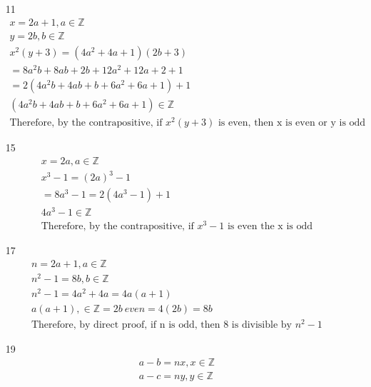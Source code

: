 \documentclass[12pt]{article}
\begin{document}
\begin{enumerate}
	\item [11]
	    \begin{equation*}
	    	\begin{split}
		    x = 2a + 1, a \in \mathbb{Z}\\
		    y = 2b, b \in \mathbb{Z}\\
		    x^2 (y+3) = (4a^2 + 4a + 1)(2b + 3)\\
		    = 8a^2b + 8ab + 2b + 12a^2 + 12a + 2 + 1\\
		    = 2(4a^2b + 4ab + b + 6a^2 + 6a + 1) + 1\\
		    (4a^2b + 4ab + b + 6a^2 + 6a + 1) \in \mathbb{Z}\\
		    \text{Therefore, by the contrapositive, if $x^2(y + 3)$ is even, then x is even or y is odd}
	    	\end{split}
	    \end{equation*}
	\item [15]
	    \begin{equation*}
	    	\begin{split}
		    x = 2a, a \in \mathbb{Z}\\
		    x^3 - 1 = (2a)^3 - 1\\
		    = 8a^3 - 1 = 2(4a^3 - 1) + 1\\
		    4a^3 - 1 \in \mathbb{Z}\\
		    \text{Therefore, by the contrapositive, if $x^3-1$ is even the x is odd}
	    	\end{split}
	    \end{equation*}
	\item [17] 
	    \begin{equation*}
	    	\begin{split}
		    n = 2a + 1, a \in \mathbb{Z}\\
		    n^2 -1 = 8b, b\in \mathbb{Z}\\
		    n^2 - 1 = 4a^2 + 4a = 4a(a + 1)\\
		    a(a+1), \in \mathbb{Z} = 2b\ even = 4(2b) = 8b\\
		    \text{Therefore, by direct proof, if n is odd, then 8 is divisible by $n^2 -1$}
	    	\end{split}
	    \end{equation*}
	\item [19] 
	    \begin{equation*}
	    	\begin{split}
		    a-b = nx, x \in \mathbb{Z}\\
		    a-c = ny, y \in \mathbb{Z}\\

\end{split}
\end{equation*}
\end{enumerate}
\end{document}
